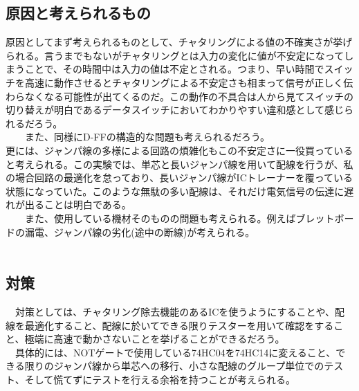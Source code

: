 \documentclass{scrartcl}
\begin{document}
\subsection{原因と考えられるもの}
\label{sec:org494d8f3}

    原因としてまず考えられるものとして、チャタリングによる値の不確実さが挙げられる。言うまでもないがチャタリングとは入力の変化に値が不安定になってしまうことで、その時間中は入力の値は不定とされる。つまり、早い時間でスイッチを高速に動作させるとチャタリングによる不安定さも相まって信号が正しく伝わらなくなる可能性が出てくるのだ。この動作の不具合は人から見てスイッチの切り替えが明白であるデータスイッチにおいてわかりやすい違和感として感じられるだろう。\\
　　また、同様にD-FFの構造的な問題も考えられるだろう。\\
    更には、ジャンパ線の多様による回路の煩雑化もこの不安定さに一役買っていると考えられる。この実験では、単芯と長いジャンパ線を用いて配線を行うが、私の場合回路の最適化を怠っており、長いジャンパ線がICトレーナーを覆っている状態になっていた。このような無駄の多い配線は、それだけ電気信号の伝達に遅れが出ることは明白である。\\
　　また、使用している機材そのものの問題も考えられる。例えばブレットボードの漏電、ジャンパ線の劣化(途中の断線)が考えられる。\\
　　\\

\subsection{対策}
\label{sec:org63fbeee}

　対策としては、チャタリング除去機能のあるICを使うようにすることや、配線を最適化すること、配線に於いてできる限りテスターを用いて確認をすること、極端に高速で動かさないことを挙げることができるだろう。\\
　具体的には、NOTゲートで使用している74HC04を74HC14に変えること、できる限りのジャンパ線から単芯への移行、小さな配線のグループ単位でのテスト、そして慌てずにテストを行える余裕を持つことが考えられる。\\
\end{document}
